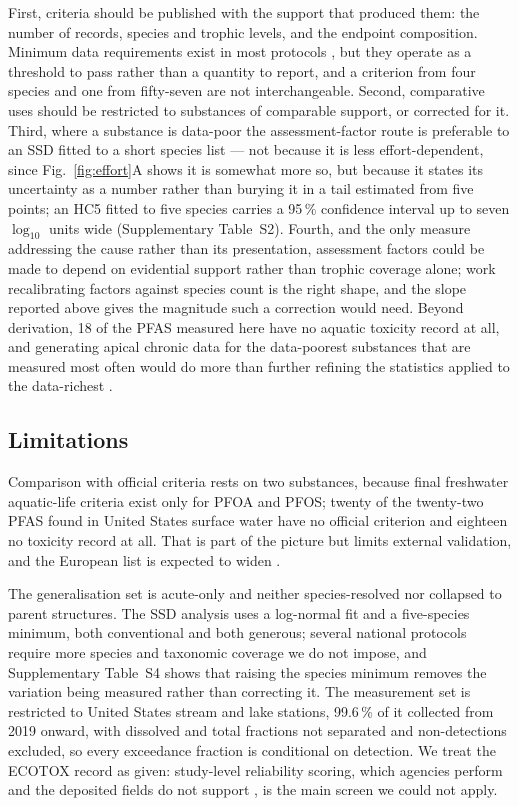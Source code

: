 \documentclass[preprint,12pt]{elsarticle}
\begin{document}
First, criteria should be published with the support that produced them: the
number of records, species and trophic levels, and the endpoint composition.
Minimum data requirements exist in most protocols \cite{hiki2018mindata,
belanger2019ssdsize}, but they operate as a threshold to pass rather than a
quantity to report, and a criterion from four species and one from fifty-seven
are not interchangeable. Second, comparative uses should be restricted to
substances of comparable support, or corrected for it. Third, where a substance
is data-poor the assessment-factor route is preferable to an SSD fitted to a
short species list --- not because it is less effort-dependent, since
Fig.~\ref{fig:effort}A shows it is somewhat more so, but because it states its
uncertainty as a number rather than burying it in a tail estimated from five
points; an HC5 fitted to five species carries a 95\,\% confidence interval up
to seven $\log_{10}$ units wide (Supplementary Table~S2). Fourth, and the only
measure addressing the cause rather than its presentation, assessment factors
could be made to depend on evidential support rather than trophic coverage
alone; work recalibrating factors against species count \cite{iwasaki2022afssd}
is the right shape, and the slope reported above gives the magnitude such a
correction would need. Beyond derivation, 18 of the PFAS measured here have no
aquatic toxicity record at all, and generating apical chronic data for the
data-poorest substances that are measured most often would do more than further
refining the statistics applied to the data-richest \cite{kim2026dualthreat}.

\subsection{Limitations}

Comparison with official criteria rests on two substances, because final
freshwater aquatic-life criteria exist only for PFOA and PFOS; twenty of the
twenty-two PFAS found in United States surface water have no official criterion
and eighteen no toxicity record at all. That is part of the picture but limits
external validation, and the European list is expected to widen
\cite{brack2023wfdcomment}.

The generalisation set is acute-only and neither species-resolved nor collapsed
to parent structures. The SSD analysis uses a log-normal fit and a five-species
minimum, both conventional and both generous; several national protocols
require more species and taxonomic coverage we do not impose, and
Supplementary Table~S4 shows that raising the species minimum removes the
variation being measured rather than correcting it. The measurement set is
restricted to United States stream and lake stations, 99.6\,\% of it collected
from 2019 onward, with dissolved and total fractions not separated and
non-detections excluded, so every exceedance fraction is conditional on
detection. We treat the ECOTOX record as given: study-level reliability
scoring, which agencies perform and the deposited fields do not support
\cite{hull2000dataquality}, is the main screen we could not apply.
\end{document}
